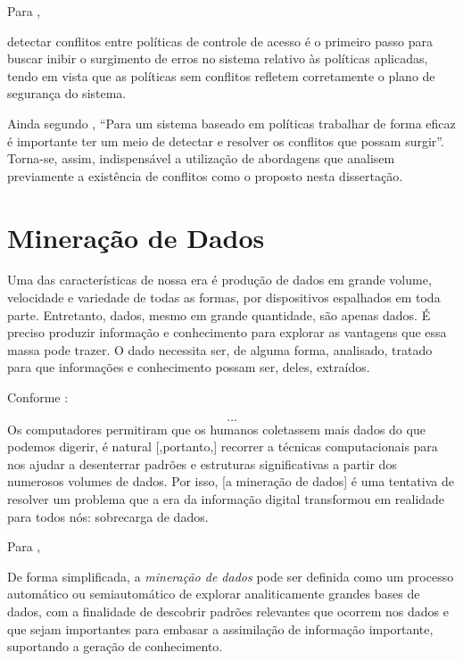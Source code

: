 Para ,
\begin{citacao}
	detectar conflitos entre políticas de controle de acesso é o primeiro passo para buscar inibir o surgimento de erros no sistema relativo às políticas aplicadas, tendo em vista que as políticas sem conflitos refletem corretamente o plano de segurança do sistema.
\end{citacao}

Ainda segundo , ``Para um sistema baseado em políticas trabalhar de forma eficaz é importante ter um meio de detectar e resolver os conflitos que possam surgir''. Torna-se, assim, indispensável a utilização de abordagens que analisem previamente a existência de conflitos como o proposto nesta dissertação.


\section{Mineração de Dados}\label{mineracao_dados}
Uma das características de nossa era é produção de dados em grande volume, velocidade e variedade de todas as formas, por dispositivos espalhados em toda parte. Entretanto, dados, mesmo em grande quantidade, são apenas dados. É preciso produzir informação e conhecimento para explorar as vantagens que essa massa pode trazer. O dado necessita ser, de alguma forma, analisado, tratado para que informações e conhecimento possam ser, deles, extraídos. \cite{aprenda_mineracao_fernando_amaral16} \cite{ferrari2017}

Conforme :
\begin{citacao}
	\[ \dots \] Os computadores permitiram que os humanos coletassem mais dados do que podemos digerir, é natural [,portanto,] recorrer a técnicas computacionais para nos ajudar a desenterrar padrões e estruturas significativas a partir dos numerosos volumes de dados. Por isso, [a mineração de dados] é uma tentativa de resolver um problema que a era da informação digital transformou em realidade para todos nós: sobrecarga de dados.
\end{citacao}

Para ,
\begin{citacao}
	De forma simplificada, a \textit{mineração de dados }pode ser definida como um processo automático ou semiautomático de explorar analiticamente grandes bases de dados, com a finalidade de descobrir padrões relevantes que ocorrem nos dados e que sejam importantes para embasar a assimilação de informação importante, suportando a geração de conhecimento. 
\end{citacao}

